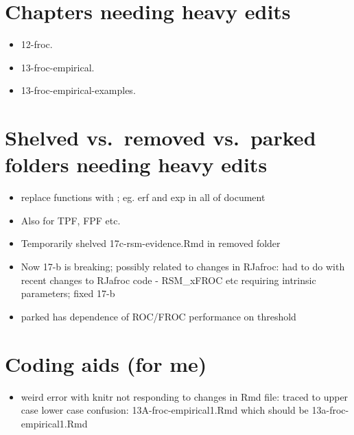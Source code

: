 \documentclass[
]{book}
\providecommand{\tightlist}{%
  \setlength{\itemsep}{0pt}\setlength{\parskip}{0pt}}
\begin{document}
\hypertarget{chapters-needing-heavy-edits}{%
\section*{Chapters needing heavy edits}\label{chapters-needing-heavy-edits}}

\begin{itemize}
\tightlist
\item
  12-froc.
\item
  13-froc-empirical.
\item
  13-froc-empirical-examples.
\end{itemize}

\hypertarget{shelved-vs.-removed-vs.-parked-folders-needing-heavy-edits}{%
\section*{Shelved vs.~removed vs.~parked folders needing heavy edits}\label{shelved-vs.-removed-vs.-parked-folders-needing-heavy-edits}}

\begin{itemize}
\tightlist
\item
  replace functions with \text{}; eg. erf and exp in all of document
\item
  Also for TPF, FPF etc.
\item
  Temporarily shelved 17c-rsm-evidence.Rmd in removed folder
\item
  Now 17-b is breaking; possibly related to changes in RJafroc: had to do with recent changes to RJafroc code - RSM\_xFROC etc requiring intrinsic parameters; fixed 17-b
\item
  parked has dependence of ROC/FROC performance on threshold
\end{itemize}

\hypertarget{coding-aids-for-me}{%
\section*{Coding aids (for me)}\label{coding-aids-for-me}}

\begin{itemize}
\tightlist
\item
  weird error with knitr not responding to changes in Rmd file: traced to upper case lower case confusion: 13A-froc-empirical1.Rmd which should be 13a-froc-empirical1.Rmd
\end{itemize}
\end{document}
